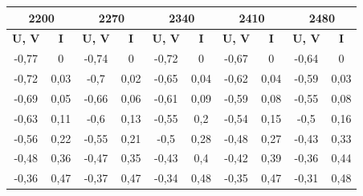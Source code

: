 \documentclass[a4paper, 12pt]{article}
\begin{document}
\begin{table}[H]
	\centering
	\begin{tabular}{|cc|cc|cc|cc|cc|}
	\hline
	\multicolumn{2}{|c|}{\textbf{2200}}              & \multicolumn{2}{c|}{\textbf{2270}}              & \multicolumn{2}{c|}{\textbf{2340}}              & \multicolumn{2}{c|}{\textbf{2410}}              & \multicolumn{2}{c|}{\textbf{2480}}              \\ \hline
	\multicolumn{1}{|c|}{\textbf{U, V}} & \textbf{I} & \multicolumn{1}{c|}{\textbf{U, V}} & \textbf{I} & \multicolumn{1}{c|}{\textbf{U, V}} & \textbf{I} & \multicolumn{1}{c|}{\textbf{U, V}} & \textbf{I} & \multicolumn{1}{c|}{\textbf{U, V}} & \textbf{I} \\ \hline
	\multicolumn{1}{|c|}{-0,77}         & 0          & \multicolumn{1}{c|}{-0,74}         & 0          & \multicolumn{1}{c|}{-0,72}         & 0          & \multicolumn{1}{c|}{-0,67}         & 0          & \multicolumn{1}{c|}{-0,64}         & 0          \\ \hline
	\multicolumn{1}{|c|}{-0,72}         & 0,03       & \multicolumn{1}{c|}{-0,7}          & 0,02       & \multicolumn{1}{c|}{-0,65}         & 0,04       & \multicolumn{1}{c|}{-0,62}         & 0,04       & \multicolumn{1}{c|}{-0,59}         & 0,03       \\ \hline
	\multicolumn{1}{|c|}{-0,69}         & 0,05       & \multicolumn{1}{c|}{-0,66}         & 0,06       & \multicolumn{1}{c|}{-0,61}         & 0,09       & \multicolumn{1}{c|}{-0,59}         & 0,08       & \multicolumn{1}{c|}{-0,55}         & 0,08       \\ \hline
	\multicolumn{1}{|c|}{-0,63}         & 0,11       & \multicolumn{1}{c|}{-0,6}          & 0,13       & \multicolumn{1}{c|}{-0,55}         & 0,2        & \multicolumn{1}{c|}{-0,54}         & 0,15       & \multicolumn{1}{c|}{-0,5}          & 0,16       \\ \hline
	\multicolumn{1}{|c|}{-0,56}         & 0,22       & \multicolumn{1}{c|}{-0,55}         & 0,21       & \multicolumn{1}{c|}{-0,5}          & 0,28       & \multicolumn{1}{c|}{-0,48}         & 0,27       & \multicolumn{1}{c|}{-0,43}         & 0,33       \\ \hline
	\multicolumn{1}{|c|}{-0,48}         & 0,36       & \multicolumn{1}{c|}{-0,47}         & 0,35       & \multicolumn{1}{c|}{-0,43}         & 0,4        & \multicolumn{1}{c|}{-0,42}         & 0,39       & \multicolumn{1}{c|}{-0,36}         & 0,44       \\ \hline
	\multicolumn{1}{|c|}{-0,36}         & 0,47       & \multicolumn{1}{c|}{-0,37}         & 0,47       & \multicolumn{1}{c|}{-0,34}         & 0,48       & \multicolumn{1}{c|}{-0,35}         & 0,47       & \multicolumn{1}{c|}{-0,31}         & 0,48       \\ \hline

\end{tabular}
\end{table}
\end{document}
